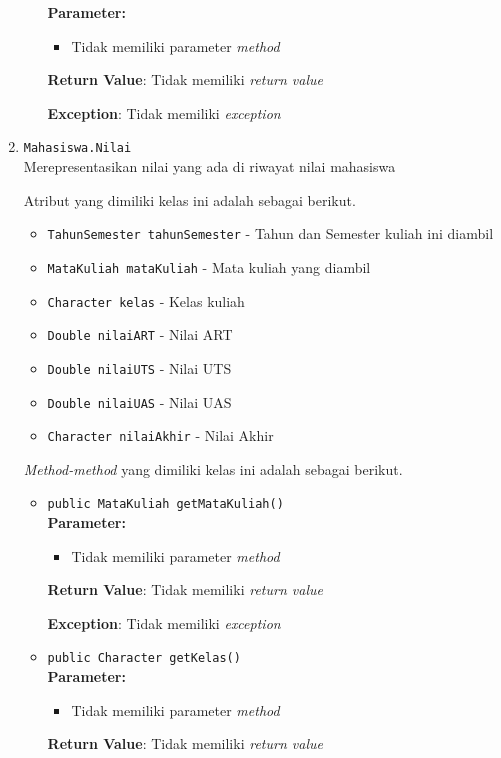 \documentclass{article}
\begin{document}
\begin{enumerate}
\begin{itemize}
\textbf{Parameter:}\begin{itemize}
\item Tidak memiliki parameter \textit{method}
\end{itemize}
\textbf{Return Value}: Tidak memiliki \textit{return value}

\textbf{Exception}: Tidak memiliki \textit{exception}

\end{itemize}
\item \texttt{Mahasiswa.Nilai}\\ 
Merepresentasikan nilai yang ada di riwayat nilai mahasiswa

Atribut yang dimiliki kelas ini adalah sebagai berikut.
\begin{itemize}
\item \texttt{TahunSemester tahunSemester} - Tahun dan Semester kuliah ini diambil
\item \texttt{MataKuliah mataKuliah} - Mata kuliah yang diambil
\item \texttt{Character kelas} - Kelas kuliah
\item \texttt{Double nilaiART} - Nilai ART
\item \texttt{Double nilaiUTS} - Nilai UTS
\item \texttt{Double nilaiUAS} - Nilai UAS
\item \texttt{Character nilaiAkhir} - Nilai Akhir
\end{itemize}
\textit{Method-method} yang dimiliki kelas ini adalah sebagai berikut.
\begin{itemize}
\item \texttt{public MataKuliah getMataKuliah()}\\ 


\textbf{Parameter:}\begin{itemize}
\item Tidak memiliki parameter \textit{method}
\end{itemize}
\textbf{Return Value}: Tidak memiliki \textit{return value}

\textbf{Exception}: Tidak memiliki \textit{exception}

\item \texttt{public Character getKelas()}\\ 


\textbf{Parameter:}\begin{itemize}
\item Tidak memiliki parameter \textit{method}
\end{itemize}
\textbf{Return Value}: Tidak memiliki \textit{return value}


\end{itemize}
\end{enumerate}
\end{document}
